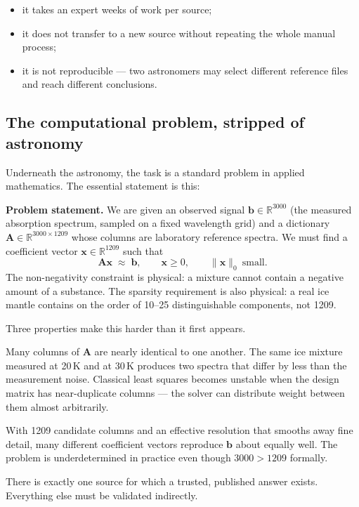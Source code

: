 \documentclass[11pt,a4paper]{article}
\begin{document}
\begin{itemize}
  \item it takes an expert weeks of work per source;
  \item it does not transfer to a new source without repeating the whole
        manual process;
  \item it is not reproducible --- two astronomers may select different
        reference files and reach different conclusions.
\end{itemize}

\subsection{The computational problem, stripped of astronomy}

Underneath the astronomy, the task is a standard problem in applied
mathematics. The essential statement is this:

\begin{keybox}
\textbf{Problem statement.} We are given an observed signal
$\mathbf{b}\in\mathbb{R}^{3000}$ (the measured absorption spectrum, sampled
on a fixed wavelength grid) and a dictionary
$\mathbf{A}\in\mathbb{R}^{3000\times 1209}$ whose columns are laboratory
reference spectra. We must find a coefficient vector
$\mathbf{x}\in\mathbb{R}^{1209}$ such that
\[
   \mathbf{A}\mathbf{x} \;\approx\; \mathbf{b},
   \qquad \mathbf{x} \ge 0,
   \qquad \|\mathbf{x}\|_0 \ \text{small.}
\]
The non-negativity constraint is physical: a mixture cannot contain a
negative amount of a substance. The sparsity requirement is also physical:
a real ice mantle contains on the order of 10--25 distinguishable
components, not 1209.
\end{keybox}

Three properties make this harder than it first appears.

\begin{description}[style=nextline, leftmargin=0pt, labelindent=0pt, labelwidth=0pt, labelsep=0pt, itemsep=4pt]
  \item[The dictionary is highly correlated.]
  Many columns of $\mathbf{A}$ are nearly identical to one another. The
  same ice mixture measured at 20\,K and at 30\,K produces two spectra that
  differ by less than the measurement noise. Classical least squares
  becomes unstable when the design matrix has near-duplicate columns ---
  the solver can distribute weight between them almost arbitrarily.

  \item[The dictionary is much wider than it is informative.]
  With 1209 candidate columns and an effective resolution that smooths
  away fine detail, many different coefficient vectors reproduce
  $\mathbf{b}$ about equally well. The problem is underdetermined in
  practice even though $3000 > 1209$ formally.

  \item[Ground truth is almost nonexistent.]
  There is exactly one source for which a trusted, published answer
  exists. Everything else must be validated indirectly.
\end{description}
\end{document}
